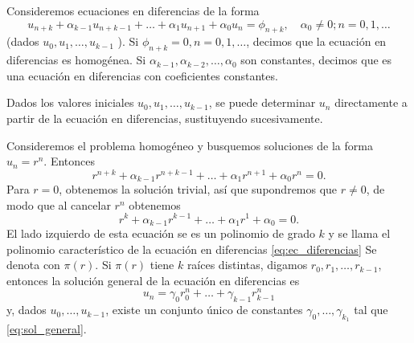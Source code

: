 \documentclass[11pt,letterpaper]{article}
\begin{document}
Consideremos ecuaciones en diferencias de la forma
\begin{equation}\label{eq:ec_diferencias}
  u_{n+k} + \alpha_{k-1}u_{n+k-1}
  + \dots +
  \alpha_1 u_{n+1}+\alpha_0u_n
  =
  \phi_{n+k},
  \quad \alpha_0 \neq 0; n=0,1,\dots
\end{equation}
(dados $u_0,u_1,\dots,u_{k-1}$ ).
Si $\phi_{n+k}=0,n=0,1,\dots$, decimos que la ecuación en diferencias
es homogénea. Si $\alpha_{k-1},\alpha_{k-2},\dots,\alpha_0$ son
constantes, decimos que es una ecuación en diferencias con
coeficientes constantes.

Dados los valores iniciales $u_0,u_1,\dots,u_{k-1}$, se puede
determinar $u_n$ directamente a partir de la ecuación en diferencias,
sustituyendo sucesivamente.

Consideremos el problema homogéneo y busquemos soluciones de la forma
$u_n=r^{n}$. Entonces
\begin{equation}
  r^{n+k} + \alpha_{k-1}r^{n+k-1}
  + \dots +
  \alpha_1 r^{n+1}+\alpha_0r^n
  =
  0.
\end{equation}
Para $r=0$, obtenemos la solución trivial, así que supondremos que
$r\neq 0$, de modo que al cancelar $r^{n}$ obtenemos
\begin{equation}
  r^{k} + \alpha_{k-1}r^{k-1}
  + \dots +
  \alpha_1 r^{1}+\alpha_0
  =
  0.
\end{equation}
El lado izquierdo de esta ecuación se es un polinomio de grado $k$ y
se llama el polinomio característico de la ecuación en diferencias
\eqref{eq:ec_diferencias} 
Se denota con $\pi(r)$.
Si $\pi(r)$ tiene $k$ raíces distintas, digamos
$r_0,r_1,\dots,r_{k-1}$, entonces la solución general de la ecuación
en diferencias es
\begin{equation}\label{eq:sol_general}
  u_n = \gamma_0r_0^{n} + \dots + \gamma_{k-1}r_{k-1}^{n}
\end{equation}
y, dados $u_0,\dots,u_{k-1}$, existe un conjunto único de constantes
$\gamma_0,\dots,\gamma_{k_1}$ tal que \eqref{eq:sol_general}.
\end{document}
